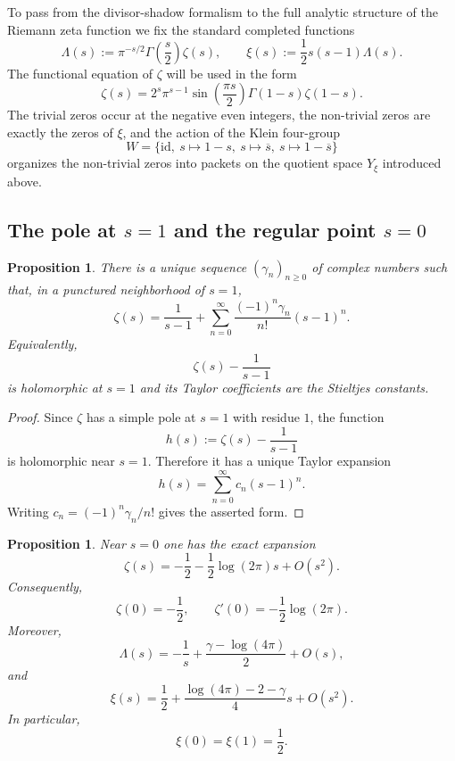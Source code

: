 \documentclass[11pt,a4paper]{article}
\numberwithin{equation}{section}
\newtheorem{proposition}[theorem]{Proposition}
\theoremstyle{definition}
\theoremstyle{remark}
\begin{document}
To pass from the divisor-shadow formalism to the full analytic structure of the Riemann zeta function we fix the standard completed functions
\[
\Lambda(s):=\pi^{-s/2}\Gamma\!\left(\frac{s}{2}\right)\zeta(s),
\qquad
\xi(s):=\frac12 s(s-1)\Lambda(s).
\]
The functional equation of $\zeta$ will be used in the form
\begin{equation}\label{eq:functional-zeta}
\zeta(s)=2^s\pi^{s-1}\sin\!\left(\frac{\pi s}{2}\right)\Gamma(1-s)\zeta(1-s).
\end{equation}
The trivial zeros occur at the negative even integers, the non-trivial zeros are exactly the zeros of $\xi$, and the action of the Klein four-group
\[
W=\{\mathrm{id},\ s\mapsto 1-s,\ s\mapsto \overline s,\ s\mapsto 1-\overline s\}
\]
organizes the non-trivial zeros into packets on the quotient space $Y_\xi$ introduced above.

\subsection{The pole at $s=1$ and the regular point $s=0$}

\begin{proposition}\label{prop:stieltjes-expansion}
There is a unique sequence $(\gamma_n)_{n\ge 0}$ of complex numbers such that, in a punctured neighborhood of $s=1$,
\begin{equation}\label{eq:stieltjes-expansion}
\zeta(s)=\frac{1}{s-1}+\sum_{n=0}^{\infty}\frac{(-1)^n\gamma_n}{n!}(s-1)^n.
\end{equation}
Equivalently,
\[
\zeta(s)-\frac{1}{s-1}
\]
is holomorphic at $s=1$ and its Taylor coefficients are the Stieltjes constants.
\end{proposition}

\begin{proof}
Since $\zeta$ has a simple pole at $s=1$ with residue $1$, the function
\[
h(s):=\zeta(s)-\frac{1}{s-1}
\]
is holomorphic near $s=1$.  Therefore it has a unique Taylor expansion
\[
h(s)=\sum_{n=0}^{\infty} c_n(s-1)^n.
\]
Writing $c_n=(-1)^n\gamma_n/n!$ gives the asserted form.
\end{proof}

\begin{proposition}\label{prop:zeta-at-zero}
Near $s=0$ one has the exact expansion
\begin{equation}\label{eq:zeta-zero-expansion}
\zeta(s)=-\frac12-\frac12\log(2\pi)s+O(s^2).
\end{equation}
Consequently,
\[
\zeta(0)=-\frac12,
\qquad
\zeta'(0)=-\frac12\log(2\pi).
\]
Moreover,
\begin{equation}\label{eq:Lambda-zero-expansion}
\Lambda(s)=-\frac1s+\frac{\gamma-\log(4\pi)}{2}+O(s),
\end{equation}
and
\begin{equation}\label{eq:xi-zero-expansion}
\xi(s)=\frac12+\frac{\log(4\pi)-2-\gamma}{4}s+O(s^2).
\end{equation}
In particular,
\[
\xi(0)=\xi(1)=\frac12.
\]
\end{proposition}
\end{document}
